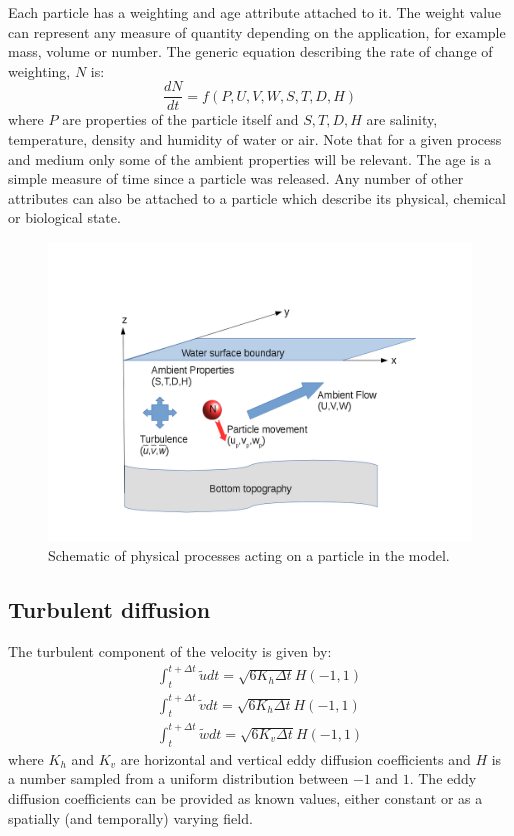 \documentclass[a4paper]{article}
\begin{document}
Each particle has a weighting and age attribute attached to it. The weight value can represent any measure of quantity depending on the application, for example mass, volume or number.
The generic equation describing the rate of change of weighting, $N$ is:
\begin{equation}\frac{dN}{dt}=f(P,U,V,W,S,T,D,H)\end{equation}
where $P$ are properties of the particle itself and $S,T,D,H$ are salinity, temperature, density and humidity of water or air.
Note that for a given process and medium only some of the ambient properties will be relevant. The age is a simple measure of time since a particle was released.
Any number of other attributes can also be attached to a particle which describe its physical, chemical or biological state.

\begin{figure}
\includegraphics[width=\textwidth]{model.png}
\caption{Schematic of physical processes acting on a particle in the model.}
\end{figure}

\subsection{Turbulent diffusion}
The turbulent component of the velocity is given by:
\begin{align}
\int_{t}^{t+\Delta t} \tilde{u} dt = \sqrt{6K_h \Delta t} H(-1,1) \\
\int_{t}^{t+\Delta t} \tilde{v} dt = \sqrt{6K_h \Delta t} H(-1,1) \\
\int_{t}^{t+\Delta t} \tilde{w} dt = \sqrt{6K_v \Delta t} H(-1,1)
\end{align}
where $K_h$ and $K_v$ are horizontal and vertical eddy diffusion coefficients and $H$ is a number sampled from a uniform distribution between $-1$ and $1$.
The eddy diffusion coefficients can be provided as known values, either constant or as a spatially (and temporally) varying field.
\end{document}
